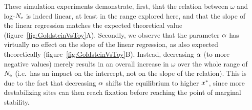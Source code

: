 These simulation experiments demonstrate, first, that the relation between $\omega$ and log-$N_{\text{e}}$ is indeed linear, at least in the range explored here, and that the slope of the linear regression matches the expected theoretical value (figure~\ref{fig:GoldsteinVsToy}A).
Secondly, we observe that the parameter $\alpha$ has virtually no effect on the slope of the linear regression, as also expected theoretically (figure~\ref{fig:GoldsteinVsToy}B).
Instead, decreasing $\alpha$ (to more negative values) merely results in an overall increase in $\omega$ over the whole range of $N_{\text{e}}$ (i.e.~has an impact on the intercept, not on the slope of the relation).
This is due to the fact that decreasing $\alpha$ shifts the equilibrium to higher $x^{*}$, since more destabilizing sites can then reach fixation before reaching the point of marginal stability.

